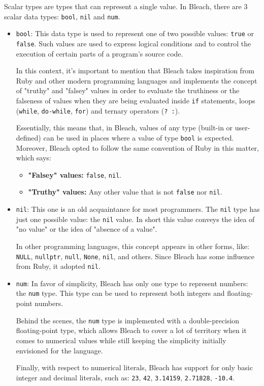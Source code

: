 Scalar types are types that can represent a single value. In Bleach, there are 3 scalar data types: \texttt{bool}, \texttt{nil} and \texttt{num}.
\begin{itemize}
    \item \texttt{bool}: This data type is used to represent one of two possible values: \texttt{true} or \texttt{false}. Such values are used to express logical conditions and to control the execution of certain parts of a program's source code.
    
    In this context, it's important to mention that Bleach takes inspiration from Ruby and other modern programming languages and implements the concept of "truthy" and "falsey" values in order to evaluate the truthiness or the falseness of values when they are being evaluated inside \texttt{if} statements, loops (\texttt{while}, \texttt{do-while}, \texttt{for}) and ternary operators (\texttt{? :}).

    Essentially, this means that, in Bleach, values of any type (built-in or user-defined) can be used in places where a value of type \texttt{bool} is expected. Moreover, Bleach opted to follow the same convention of Ruby in this matter, which says:

    \begin{itemize}
        \item \textbf{"Falsey" values:} \texttt{false}, \texttt{nil}.
        \item \textbf{"Truthy" values:} Any other value that is not \texttt{false} nor \texttt{nil}.
    \end{itemize}
    
    \item \texttt{nil}: This one is an old acquaintance for most programmers. The \texttt{nil} type has just one possible value: the \texttt{nil} value. In short this value conveys the idea of "no value" or the idea of "absence of a value".

    In other programming languages, this concept appears in other forms, like: \texttt{NULL}, \texttt{nullptr}, \texttt{null}, \texttt{None}, \texttt{nil}, and others. Since Bleach has some influence from Ruby, it adopted \texttt{nil}.
    
    \item \texttt{num}: In favor of simplicity, Bleach has only one type to represent numbers: the \texttt{num} type. This type can be used to represent both integers and floating-point numbers.

    Behind the scenes, the \texttt{num} type is implemented with a double-precision floating-point type, which allows Bleach to cover a lot of territory when it comes to numerical values while still keeping the simplicity initially envisioned for the language.
    
    Finally, with respect to numerical literals, Bleach has support for only basic integer and decimal literals, such as: \texttt{23}, \texttt{42}, \texttt{3.14159}, \texttt{2.71828}, \texttt{-10.4}.
    
\end{itemize}

